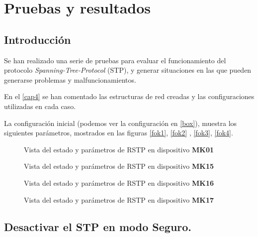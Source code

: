 
\chapter{Pruebas y resultados}

\section{Introducción}

Se han realizado una serie de pruebas para evaluar el funcionamiento del protocolo\textit{ Spanning-Tree-Protocol} (STP), y generar situaciones en las que pueden generarse problemas y malfuncionamientos.

En el \autoref{cap4} se han comentado las estructuras de red creadas y las configuraciones utilizadas en cada caso.

La configuración inicial (podemos ver la configuración en \autoref{box}), muestra los siguientes parámetros, mostrados en las figuras \autoref{fok1}, \autoref{fok2} , \autoref{fok3}, \autoref{fok4}.

\begin{figure}[h!]\centering
	\caption{Vista del estado y parámetros de RSTP en dispositivo \textbf{MK01}}
	\label{fok3}
	\bigskip
\end{figure}

\begin{figure}[h!]\centering
	\caption{Vista del estado y parámetros de RSTP en dispositivo \textbf{MK15}}
	\label{fok4}
	\bigskip
\end{figure}

\begin{figure}[h!]\centering
	\caption{Vista del estado y parámetros de RSTP en dispositivo \textbf{MK16}}
	\label{fok1}
	\bigskip
\end{figure}

\begin{figure}[h!]\centering
	\caption{Vista del estado y parámetros de RSTP en dispositivo \textbf{MK17}}
	\label{fok2}
	\bigskip
\end{figure}

\section{Desactivar el STP en modo Seguro.}

